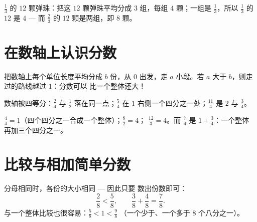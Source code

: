 \begin{example}[一组物体的分数]\label{ex:g4:fractions:collection}
$\frac13$ 的 $12$ 颗弹珠：把这 $12$ 颗弹珠平均分成 $3$
组，每组 $4$ 颗；一组是 $\frac13$，所以 $\frac13$ 的 $12$ 是 $4$
--- 而 $\frac23$ 的 $12$ 颗是两组，即 $8$ 颗。
\end{example}

\section{在数轴上认识分数}

\begin{method}\label{met:g4:fractions:line}
把数轴上每个单位长度平均分成 $b$ 份，从 $0$ 出发，走 $a$
小段。若 $a$ 大于 $b$，则走过的路线越过 $1$：分数可以
比一个整体还大！
\end{method}

\begin{omfigure}

{\small 数轴被四等分：$\frac24$ 与
$\frac12$ 落在同一点；$\frac54$ 在 $1$ 右侧一个四分之一处；$\frac{11}{4}$ 是
$2$ 与 $\frac34$。}
\end{omfigure}

\begin{example}[藏在分数里的整数]\label{ex:g4:fractions:whole}
$\frac44 = 1$（四个四分之一合成一个整体）；$\frac82 = 4$；
$\frac{12}{3} = 4$。而 $\frac74$ 是 $1 + \frac34$：一个整体
再加三个四分之一。
\end{example}

\section{比较与相加简单分数}

\begin{proposition}[分母相同]\label{prop:g4:fractions:compare}
分母相同时，各份的大小相同 --- 因此只要
数出份数即可：
\[
\frac{2}{8} < \frac{5}{8},
\qquad
\frac{3}{8} + \frac{4}{8} = \frac{7}{8}.
\]
与一个整体比较也很容易：$\frac{5}{8} < 1 < \frac{9}{8}$
（一个少于、一个多于 $8$ 个八分之一）。
\end{proposition}

